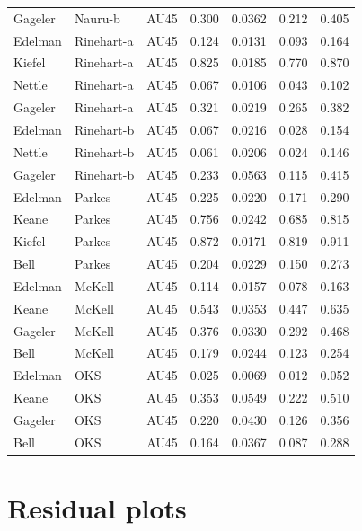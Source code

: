 \documentclass{monashthesis}
\begin{document}
\begin{center}
\begin{longtable}{lllllll}
Gageler & Nauru-b & AU45 & 0.300 & 0.0362 & 0.212 & 0.405 \\
Edelman & Rinehart-a & AU45 & 0.124 & 0.0131 & 0.093 & 0.164 \\
Kiefel & Rinehart-a & AU45 & 0.825 & 0.0185 & 0.770 & 0.870 \\
Nettle & Rinehart-a & AU45 & 0.067 & 0.0106 & 0.043 & 0.102 \\
Gageler & Rinehart-a & AU45 & 0.321 & 0.0219 & 0.265 & 0.382 \\
Edelman & Rinehart-b & AU45 & 0.067 & 0.0216 & 0.028 & 0.154 \\
Nettle & Rinehart-b & AU45 & 0.061 & 0.0206 & 0.024 & 0.146 \\
Gageler & Rinehart-b & AU45 & 0.233 & 0.0563 & 0.115 & 0.415 \\
Edelman & Parkes & AU45 & 0.225 & 0.0220 & 0.171 & 0.290 \\
Keane & Parkes & AU45 & 0.756 & 0.0242 & 0.685 & 0.815 \\
Kiefel & Parkes & AU45 & 0.872 & 0.0171 & 0.819 & 0.911 \\
Bell & Parkes & AU45 & 0.204 & 0.0229 & 0.150 & 0.273 \\
Edelman & McKell & AU45 & 0.114 & 0.0157 & 0.078 & 0.163 \\
Keane & McKell & AU45 & 0.543 & 0.0353 & 0.447 & 0.635 \\
Gageler & McKell & AU45 & 0.376 & 0.0330 & 0.292 & 0.468 \\
Bell & McKell & AU45 & 0.179 & 0.0244 & 0.123 & 0.254 \\
Edelman & OKS & AU45 & 0.025 & 0.0069 & 0.012 & 0.052 \\
Keane & OKS & AU45 & 0.353 & 0.0549 & 0.222 & 0.510 \\
Gageler & OKS & AU45 & 0.220 & 0.0430 & 0.126 & 0.356 \\
Bell & OKS & AU45 & 0.164 & 0.0367 & 0.087 & 0.288 \\
\end{longtable}
\end{center}

\hypertarget{residual-plots}{%
\section{Residual plots}\label{residual-plots}}
\end{document}
